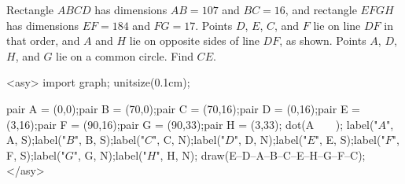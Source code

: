 Rectangle $ABCD$ has dimensions $AB = 107$ and $BC = 16$, and rectangle $EFGH$ has dimensions $EF = 184$ and $FG = 17$. Points $D$, $E$, $C$, and $F$ lie on line $DF$ in that order, and $A$ and $H$ lie on opposite sides of line $DF$, as shown. Points $A$, $D$, $H$, and $G$ lie on a common circle. Find $CE$.

<asy>
import graph;
unitsize(0.1cm);

pair A = (0,0);pair B = (70,0);pair C = (70,16);pair D = (0,16);pair E = (3,16);pair F = (90,16);pair G = (90,33);pair H = (3,33);
dot(A^^B^^C^^D^^E^^F^^G^^H);
label("$A$", A, S);label("$B$", B, S);label("$C$", C, N);label("$D$", D, N);label("$E$", E, S);label("$F$", F, S);label("$G$", G, N);label("$H$", H, N);
draw(E--D--A--B--C--E--H--G--F--C);
</asy>

